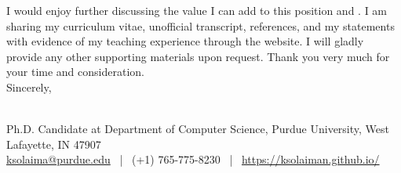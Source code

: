 \documentclass[10pt]{article}
\begin{document}
I would enjoy further discussing the value I can add to this position and \InstitutionName{}. I am sharing my 
curriculum vitae, 
unofficial transcript,  
references,
and my statements 
with evidence of my teaching experience 
through the website. 
I will gladly provide any other supporting materials upon request. Thank you very much for your time and consideration.\\



Sincerely, 

\Name{} \\
\normalsize  \textnormal{
          Ph.D. Candidate at Department of Computer Science, Purdue University, West Lafayette, IN 47907
        }\\
        \normalsize \textnormal{ %
          \href{mailto:ksolaima@purdue.edu}{ksolaima@purdue.edu} ~|~ %
          (+1) 765-775-8230 ~|~ %
          \href{https://ksolaiman.github.io/}{https://ksolaiman.github.io/}
}

\end{document}
